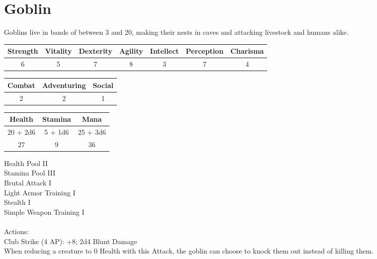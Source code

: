 \section{Goblin}

Goblins live in bands of between 3 and 20, making their nests in caves and attacking livestock and humans alike.

\begin{minipage}[H]{1\textwidth}
    \centering
    \begin{tabular}[c]{|c | c | c | c | c | c | c|}
        \hline
        Strength & Vitality & Dexterity & Agility & Intellect & Perception & Charisma\\
        \hline
        6 & 5 & 7 & 8 & 3 & 7 & 4\\
        \hline
    \end{tabular}
\end{minipage}
\begin{minipage}[H]{1\textwidth}
    \centering
    \begin{tabular}[c]{|c | c | c|}
        \hline
        Combat & Adventuring & Social\\
        \hline
        2 & 2 & 1\\
        \hline
    \end{tabular}
\end{minipage}
\begin{minipage}[H]{1\textwidth}
    \centering
    \begin{tabular}[c]{|c | c | c|}
        \hline
        Health & Stamina & Mana\\
        \hline
        20 + 2d6 & 5 + 1d6 & 25 + 3d6\\
        27 & 9 & 36\\
        \hline
    \end{tabular}
\end{minipage}
Health Pool II\\
Stamina Pool III\\
Brutal Attack I\\
Light Armor Training I\\
Stealth I\\
Simple Weapon Training I\\
\\
Actions:\\
Club Strike (4 AP): +8; 2d4 Blunt Damage\\
When reducing a creature to 0 Health with this Attack, the goblin can choose to knock them out instead of killing them.\\

